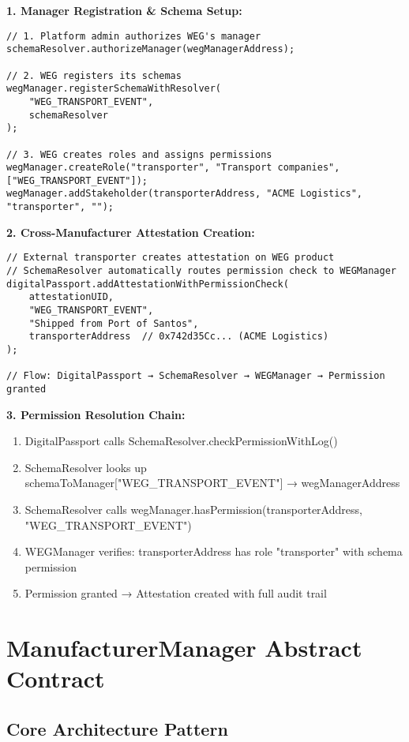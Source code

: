 \documentclass[11pt,a4paper]{article}
\begin{document}
\textbf{1. Manager Registration \& Schema Setup:}
\begin{verbatim}
// 1. Platform admin authorizes WEG's manager
schemaResolver.authorizeManager(wegManagerAddress);

// 2. WEG registers its schemas
wegManager.registerSchemaWithResolver(
    "WEG_TRANSPORT_EVENT", 
    schemaResolver
);

// 3. WEG creates roles and assigns permissions
wegManager.createRole("transporter", "Transport companies", ["WEG_TRANSPORT_EVENT"]);
wegManager.addStakeholder(transporterAddress, "ACME Logistics", "transporter", "");
\end{verbatim}

\textbf{2. Cross-Manufacturer Attestation Creation:}
\begin{verbatim}
// External transporter creates attestation on WEG product
// SchemaResolver automatically routes permission check to WEGManager
digitalPassport.addAttestationWithPermissionCheck(
    attestationUID,
    "WEG_TRANSPORT_EVENT", 
    "Shipped from Port of Santos",
    transporterAddress  // 0x742d35Cc... (ACME Logistics)
);

// Flow: DigitalPassport → SchemaResolver → WEGManager → Permission granted
\end{verbatim}

\textbf{3. Permission Resolution Chain:}
\begin{enumerate}
    \item DigitalPassport calls SchemaResolver.checkPermissionWithLog()
    \item SchemaResolver looks up schemaToManager["WEG\_TRANSPORT\_EVENT"] → wegManagerAddress
    \item SchemaResolver calls wegManager.hasPermission(transporterAddress, "WEG\_TRANSPORT\_EVENT")
    \item WEGManager verifies: transporterAddress has role "transporter" with schema permission
    \item Permission granted → Attestation created with full audit trail
\end{enumerate}

\section{ManufacturerManager Abstract Contract}

\subsection{Core Architecture Pattern}
\end{document}
